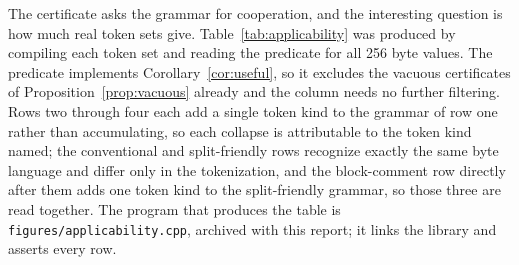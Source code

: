 \documentclass[11pt,a4paper]{article}
\theoremstyle{definition}
\theoremstyle{plain}
\newcommand{\code}[1]{\texttt{#1}}
\begin{document}
The certificate asks the grammar for cooperation, and the interesting question is how much real token sets give.
Table~\ref{tab:applicability} was produced by compiling each token set and reading the predicate for all 256 byte
values. The predicate implements Corollary~\ref{cor:useful}, so it excludes the vacuous certificates of
Proposition~\ref{prop:vacuous} already and the column needs no further filtering. Rows two through four each add a
single token kind to the grammar of row one rather than accumulating, so each collapse is attributable to the token
kind named; the conventional and split-friendly rows recognize exactly the same byte language and differ only in the
tokenization, and the block-comment row directly after them adds one token kind to the split-friendly grammar, so
those three are read together. The program that produces the table is \code{figures/applicability.cpp}, archived with
this report; it links the library and asserts every row.
\end{document}
